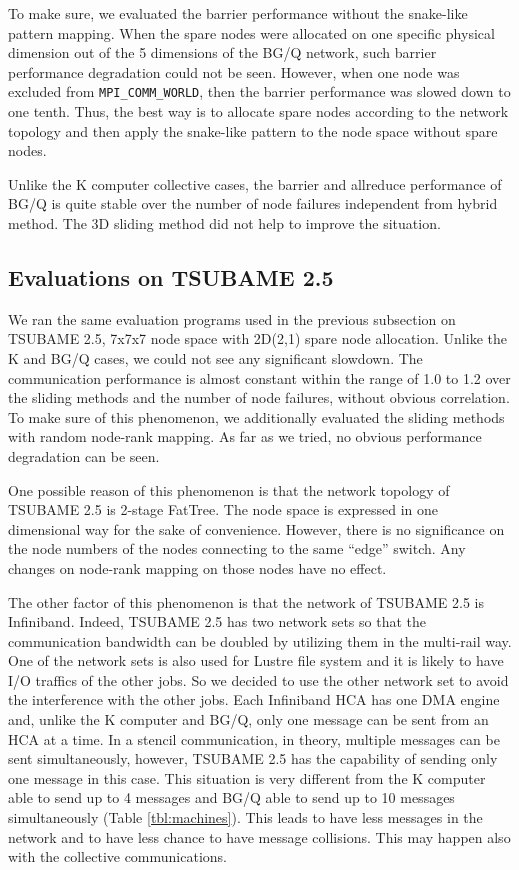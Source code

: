 \documentclass[Afour,times,sagev]{sagej}
\begin{document}
To make sure, we evaluated the barrier performance
without the snake-like pattern mapping. When the spare nodes were
allocated on one specific physical dimension out of the 5 dimensions
of the BG/Q network, such barrier performance degradation could not be
seen. However, when one node was excluded from {\tt MPI\_COMM\_WORLD},
then the barrier performance was slowed down to one tenth. Thus, the
best way is to allocate spare nodes according to the network topology
and then apply the snake-like pattern to the node space without spare
nodes. 

Unlike the K computer collective cases, the barrier and allreduce
performance of BG/Q is quite stable over the number of node failures
independent from hybrid method. The 3D sliding method did not help to
improve the situation.

\subsection{Evaluations on TSUBAME 2.5}

We ran the same evaluation programs used in the previous subsection on
TSUBAME 2.5, 7x7x7 node space with 2D(2,1) spare node
allocation. Unlike the K and BG/Q cases, 
we could not see any significant slowdown. The communication
performance is almost constant within the range of 1.0 to 1.2 over the
sliding methods and the number of node failures, without obvious
correlation. To make sure of this phenomenon, we additionally
evaluated the sliding methods with random node-rank mapping. As far as
we tried, no obvious performance degradation can be seen.

One possible reason of this phenomenon is that the network topology of
TSUBAME 2.5 is 2-stage FatTree. The node space is expressed in one
dimensional way for the sake of convenience. However, there is no
significance on the node numbers of the nodes connecting to the same
``edge'' switch. Any changes on node-rank mapping on those nodes have
no effect. 

The other factor of this phenomenon is that the network of TSUBAME 2.5
is Infiniband. Indeed, TSUBAME 2.5 has two network sets so that the
communication bandwidth can be doubled by utilizing them in the
multi-rail way\cite{1392963}. One of the network sets is also used for
Lustre file system and it is likely to have I/O traffics of the other
jobs. So we decided to use the other network set to 
avoid the interference with the other jobs. Each Infiniband HCA has
one DMA engine and, unlike the K computer and BG/Q, only one message
can be sent from an HCA at a time. In a stencil communication, in
theory, multiple messages can be sent simultaneously, however, TSUBAME
2.5 has the capability of sending only one message in this case. This
situation is very different from the K computer able to send up to 4
messages and BG/Q able to send up to 10 messages simultaneously (Table
\ref{tbl:machines}). This leads to have less messages in the network
and to have less chance to have message collisions. This may happen
also with the collective communications.
\end{document}
